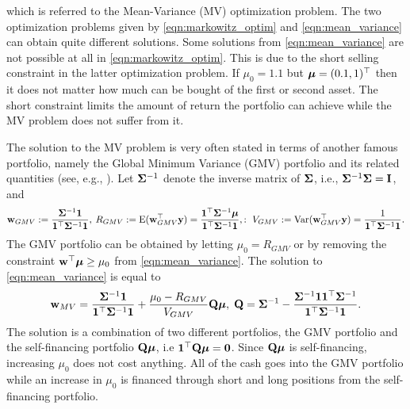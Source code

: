 \documentclass[12pt, twoside]{book}\usepackage{knitr}
\begin{document}
which is referred to the Mean-Variance (MV) optimization problem. 
The two optimization problems given by \eqref{eqn:markowitz_optim} and \eqref{eqn:mean_variance} can obtain quite different solutions. 
Some solutions from \eqref{eqn:mean_variance} are not possible at all in \eqref{eqn:markowitz_optim}.
This is due to the short selling constraint in the latter optimization problem.
If $\mu_0=1.1$ but $\mbox{\boldmath$\mu$}= (0.1, 1)^\top$ then it does not matter how much can be bought of the first or second asset.
The short constraint limits the amount of return the portfolio can achieve while the MV problem does not suffer from it.

The solution to the MV problem is very often stated in terms of another famous portfolio, namely the Global Minimum Variance (GMV) portfolio and its related quantities (see, e.g., \cite{Bodnar2009CaIotEFiEM}). 
Let $\mathbf{\Sigma}^{-1}$ denote the inverse matrix of $\mathbf{\Sigma}$, i.e., $\mathbf{\Sigma}^{-1}\mathbf{\Sigma} = \mathbf{I}$, and
\begin{equation}\label{eqn:GMV}
	\mathbf{w}_{GMV} := \frac{\mathbf{\Sigma}^{-1}\mathbf{1}}{\mathbf{1}^\top \mathbf{\Sigma}^{-1}\mathbf{1}},
	\: R_{GMV} :=\operatorname{E}(\mathbf{w}_{GMV}^\top\mathbf{y}) = \frac{\mathbf{1}^\top\mathbf{\Sigma}^{-1}\mbox{\boldmath$\mu$}}{\mathbf{1}^\top \mathbf{\Sigma}^{-1}\mathbf{1}},
	:\ V_{GMV} := \operatorname{Var}(\mathbf{w}_{GMV}^\top\mathbf{y}) =\frac{1}{\mathbf{1}^\top \mathbf{\Sigma}^{-1}\mathbf{1}}.
\end{equation}
The GMV portfolio can be obtained by letting $\mu_0=R_{GMV}$ or by removing the constraint $\mathbf{w}^\top \mbox{\boldmath$\mu$} \geq \mu_0$ from \eqref{eqn:mean_variance}. 
The solution to \eqref{eqn:mean_variance} is equal to
\begin{equation}\label{eqn:mean_var_solution}
	\mathbf{w}_{MV} = \frac{\mathbf{\Sigma}^{-1}\mathbf{1}}{\mathbf{1}^\top \mathbf{\Sigma}^{-1}\mathbf{1}} + \frac{\mu_0 - R_{GMV}}{V_{GMV}} \mathbf{Q} \mbox{\boldmath$\mu$},\; \mathbf{Q} = \mathbf{\Sigma}^{-1} - \frac{\mathbf{\Sigma}^{-1} \mathbf{1} \mathbf{1}^\top \mathbf{\Sigma}^{-1}}{\mathbf{1}^\top \mathbf{\Sigma}^{-1} \mathbf{1}}.
\end{equation}
The solution is a combination of two different portfolios, the GMV portfolio and the self-financing portfolio $\mathbf{Q} \mbox{\boldmath$\mu$}$, i.e $\mathbf{1}^\top \mathbf{Q} \mbox{\boldmath$\mu$} = \mathbf{0}$. 
Since $\mathbf{Q} \mbox{\boldmath$\mu$}$ is self-financing, increasing $\mu_0$ does not cost anything.
All of the cash goes into the GMV portfolio while an increase in $\mu_0$ is financed through short and long positions from the self-financing portfolio.
\end{document}
